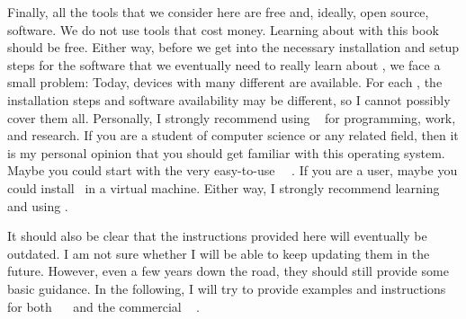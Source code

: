 Finally, all the tools that we consider here are free and, ideally, open source, software.
We do not use tools that cost money.
Learning about  with this book should be free.%
%
%
%
Either way, before we get into the necessary installation and setup steps for the software that we eventually need to really learn about , we face a small problem:
Today, devices with many different  are available.
For each , the installation steps and software availability may be different, so I cannot possibly cover them all.
Personally, I strongly recommend using \linux~\cite{T1999TLE,B2022ELATCL,H2022LML} for programming, work, and research.
If you are a student of computer science or any related field, then it is my personal opinion that you should get familiar with this operating system.
%
%
%
Maybe you could start with the very easy-to-use \ubuntu\ \linux~\cite{CN2020ULB,H2020ULU2E}.
If you are a \microsoftWindows\cite{B2023W1IO} user, maybe you could install \ubuntu\ in a virtual machine.
Either way, I strongly recommend learning and using \linux.

It should also be clear that the instructions provided here will eventually be outdated.
I am not sure whether I will be able to keep updating them in the future.
However, even a few years down the road, they should still provide some basic guidance.
In the following, I will try to provide examples and instructions for both \ubuntu\ \linux~\cite{CN2020ULB,H2020ULU2E} and the commercial \microsoftWindows~\cite{B2023W1IO} .%
%
%
%
%
%
%
%
%
\endhsection%
%
